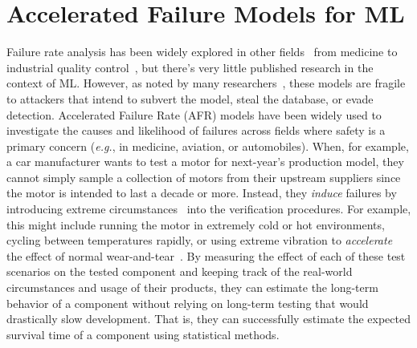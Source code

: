 
\section{Accelerated Failure Models for ML}
\label{afr_models}
Failure rate analysis has been widely explored in other fields~\citep{aft_models} from medicine to industrial quality control~\citep{ai_medical_imaging,ai_industry,ai_aviation,ai_luggage,ai_security,ai_prison}, but there's very little published research in the context of ML. However, as noted by many researchers~\citep{madry2017towards, carlini_towards_2017, croce_reliable_2020, meyers}, these models are fragile to attackers that intend to subvert the model, steal the database, or evade detection.  Accelerated Failure Rate (AFR) models have been widely used to investigate the causes and likelihood of failures across fields where safety is a primary concern (\textit{e.g.}, in medicine, aviation, or automobiles). When, for example, a car manufacturer wants to test a motor for next-year's production model, they cannot simply sample a collection of motors from their upstream suppliers since the motor is intended to last a decade or more. Instead, they \textit{induce} failures by introducing extreme circumstances~\citep{liu2013development,lawless1995methods} into the verification procedures. For example, this might include running the motor in extremely cold or hot environments, cycling between temperatures rapidly, or using extreme vibration to \textit{accelerate} the effect of normal wear-and-tear~\citep{meeker1998accelerated}. By measuring the effect of each of these test scenarios on the tested component and keeping track of the real-world circumstances and usage of their products, they can estimate the long-term behavior of a component without relying on long-term testing that would drastically slow development. That is, they can successfully estimate the expected survival time of a component using statistical methods. 


